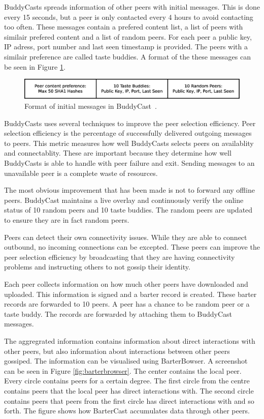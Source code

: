 BuddyCasts spreads information of other peers with initial messages.
This is done every 15 seconds, but a peer is only contacted every 4 hours to avoid contacting too often.
These messages contain a prefered content list, a list of peers with similair prefered content
and a list of random peers.
For each peer a public key, IP adress, port number and last seen timestamp is provided.
The peers with a similair preference are called taste buddies.
A format of the these messages can be seen in Figure \ref{fig:buddycast-format}.

\begin{figure}
	\centerline{\includegraphics[scale=0.3]{relatedWork/figs/buddycast-format.eps}}
	\caption{Format of initial messages in BuddyCast~\cite{pouwelse-buddycast}.}
	\label{fig:buddycast-format}
\end{figure}

BuddyCasts uses several techniques to improve the peer selection efficiency.
Peer selection efficiency is the percentage of successfully delivered outgoing messages to peers.
This metric measures how well BuddyCasts selects peers on availablity and connectablity.
These are important because they determine how well BuddyCasts is able to handle with peer failure and exit.
Sending messages to an unavailable peer is a complete waste of resources.

The most obvious improvement that has been made is not to forward any offline peers.
BuddyCast maintains a live overlay
and continuously verify the online status of 10 random peers and 10 taste buddies.
The random peers are updated to ensure they are in fact random peers.

Peers can detect their own connectivity issues.
While they are able to connect outbound,
no incoming connections can be excepted.
These peers can improve the peer selection efficiency
by broadcasting that they are having connectivity problems
and instructing others to not gossip their identity.

Each peer collects information on how much other peers have downloaded and uploaded.
This information is signed and a barter record is created.
These barter records are forwarded to 10 peers.
A peer has a chance to be random peer or a taste buddy.
The records are forwarded by attaching them to BuddyCast messages.

The aggregrated information contains information about direct interactions with other peers,
but also information about interactions between other peers gossiped.
The information can be visualised using BarterBowser.
A screenshot can be seen in Figure \ref{fig:barterbrowser}.
The center contains the local peer.
Every circle contains peers for a certain degree.
The first circle from the centre contains peers that the local peer has direct interactions with.
The second circle contains peers that peers from the first circle has direct interactions with and so forth.
The figure shows how BarterCast accumulates data through other peers.

